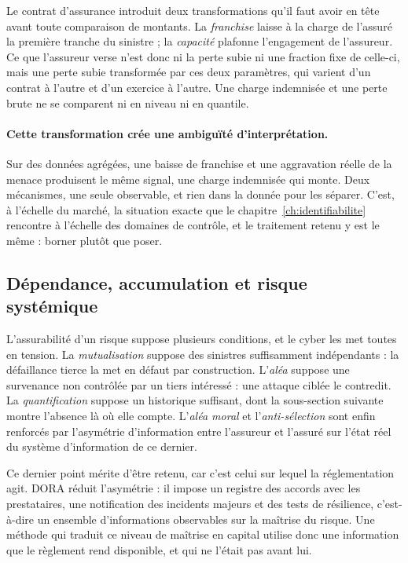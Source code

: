 Le contrat d'assurance introduit deux transformations qu'il faut avoir en tête avant toute
comparaison de montants. La \emph{franchise} laisse à la charge de l'assuré la première tranche
du sinistre ; la \emph{capacité} plafonne l'engagement de l'assureur. Ce que l'assureur verse
n'est donc ni la perte subie ni une fraction fixe de celle-ci, mais une perte subie transformée
par ces deux paramètres, qui varient d'un contrat à l'autre et d'un exercice à l'autre. Une
charge indemnisée et une perte brute ne se comparent ni en niveau ni en quantile.

\paragraph{Cette transformation crée une ambiguïté d'interprétation.} Sur des données agrégées,
une baisse de franchise et une aggravation réelle de la menace produisent le même signal, une
charge indemnisée qui monte. Deux mécanismes, une seule observable, et rien dans la donnée pour
les séparer. C'est, à l'échelle du marché, la situation exacte que le
chapitre~\ref{ch:identifiabilite} rencontre à l'échelle des domaines de contrôle, et le
traitement retenu y est le même : borner plutôt que poser.

\subsection{Dépendance, accumulation et risque systémique}
\label{subsec:dependance-accumulation}

L'assurabilité d'un risque suppose plusieurs conditions, et le cyber les met toutes en tension.
La \emph{mutualisation} suppose des sinistres suffisamment indépendants : la défaillance tierce
la met en défaut par construction. L'\emph{aléa} suppose une survenance non contrôlée par un
tiers intéressé : une attaque ciblée le contredit. La \emph{quantification} suppose un
historique suffisant, dont la sous-section suivante montre l'absence là où elle compte.
L'\emph{aléa moral} et l'\emph{anti-sélection} sont enfin renforcés par l'asymétrie
d'information entre l'assureur et l'assuré sur l'état réel du système d'information de ce
dernier.

Ce dernier point mérite d'être retenu, car c'est celui sur lequel la réglementation agit. DORA
réduit l'asymétrie : il impose un registre des accords avec les prestataires, une notification
des incidents majeurs et des tests de résilience, c'est-à-dire un ensemble d'informations
observables sur la maîtrise du risque. Une méthode qui traduit ce niveau de maîtrise en capital
utilise donc une information que le règlement rend disponible, et qui ne l'était pas avant lui.

